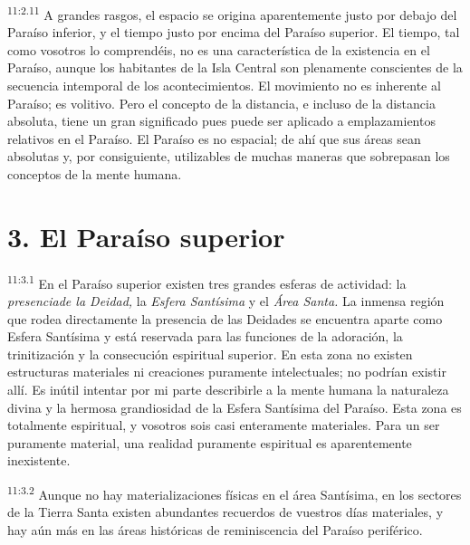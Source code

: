 \par
\textsuperscript{11:2.11} A grandes rasgos, el espacio se origina aparentemente justo por debajo del Paraíso inferior, y el tiempo justo por encima del Paraíso superior. El tiempo, tal como vosotros lo comprendéis, no es una característica de la existencia en el Paraíso, aunque los habitantes de la Isla Central son plenamente conscientes de la secuencia intemporal de los acontecimientos. El movimiento no es inherente al Paraíso; es volitivo. Pero el concepto de la distancia, e incluso de la distancia absoluta, tiene un gran significado pues puede ser aplicado a emplazamientos relativos en el Paraíso. El Paraíso es no espacial; de ahí que sus áreas sean absolutas y, por consiguiente, utilizables de muchas maneras que sobrepasan los conceptos de la mente humana.

\section*{3. El Paraíso superior}
\par
\textsuperscript{11:3.1} En el Paraíso superior existen tres grandes esferas de actividad: la \textit{presenciade la Deidad,} la \textit{Esfera Santísima} y el \textit{Área Santa.} La inmensa región que rodea directamente la presencia de las Deidades se encuentra aparte como Esfera Santísima y está reservada para las funciones de la adoración, la trinitización y la consecución espiritual superior. En esta zona no existen estructuras materiales ni creaciones puramente intelectuales; no podrían existir allí. Es inútil intentar por mi parte describirle a la mente humana la naturaleza divina y la hermosa grandiosidad de la Esfera Santísima del Paraíso. Esta zona es totalmente espiritual, y vosotros sois casi enteramente materiales. Para un ser puramente material, una realidad puramente espiritual es aparentemente inexistente.

\par
\textsuperscript{11:3.2} Aunque no hay materializaciones físicas en el área Santísima, en los sectores de la Tierra Santa existen abundantes recuerdos de vuestros días materiales, y hay aún más en las áreas históricas de reminiscencia del Paraíso periférico.

